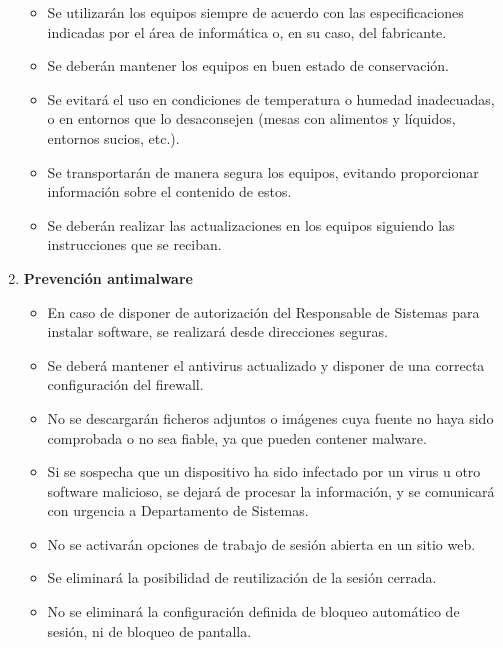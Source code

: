\begin{enumerate}[label=\alph*)]
\begin{itemize}
\item Se utilizarán los equipos siempre de acuerdo con las especificaciones indicadas por el área de informática o, en su caso, del fabricante.
\item Se deberán mantener los equipos en buen estado de conservación.
\item Se evitará el uso en condiciones de temperatura o humedad inadecuadas, o en entornos que lo desaconsejen (mesas con alimentos y líquidos, entornos sucios, etc.).
\item Se transportarán de manera segura los equipos, evitando proporcionar información sobre el contenido de estos.
\item Se deberán realizar las actualizaciones en los equipos siguiendo las instrucciones que se reciban.
\end{itemize}

\item \textbf{Prevención antimalware}

\begin{itemize}
\item En caso de disponer de autorización del Responsable de Sistemas para instalar software, se realizará desde direcciones seguras.
\item Se deberá mantener el antivirus actualizado y disponer de una correcta configuración del firewall.
\item No se descargarán ficheros adjuntos o imágenes cuya fuente no haya sido comprobada o no sea fiable, ya que pueden contener malware.
\item Si se sospecha que un dispositivo ha sido infectado por un virus u otro software malicioso, se dejará de procesar la información, y se comunicará con urgencia a Departamento de Sistemas.
\item No se activarán opciones de trabajo de sesión abierta en un sitio web.
\item Se eliminará la posibilidad de reutilización de la sesión cerrada.
\item No se eliminará la configuración definida de bloqueo automático de sesión, ni de bloqueo de pantalla.
\end{itemize}

\end{enumerate}